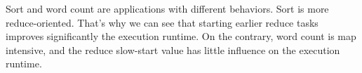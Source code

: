 \documentclass[a4paper]{article}
\begin{document}
Sort and word count are applications with different behaviors.
Sort is more reduce-oriented.
That's why we can see that starting earlier reduce tasks improves significantly the execution runtime.
On the contrary, word count is map intensive, and the reduce slow-start value has little influence on the execution runtime.

\newpage
\appendix


\end{document}
